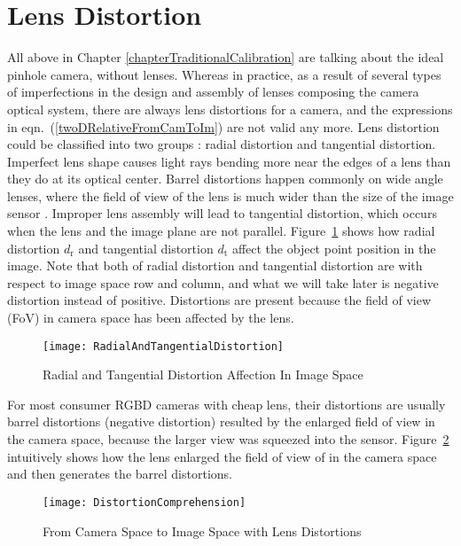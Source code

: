 \section{Lens Distortion}
\indent
All above in Chapter \ref{chapterTraditionalCalibration} are talking about the ideal pinhole camera, without lenses. Whereas in practice, as a result of several types of imperfections in the design and assembly of lenses composing the camera optical system, there are always lens distortions for a camera, and the expressions in eqn.~(\ref{twoDRelativeFromCamToIm}) are not valid any more. Lens distortion could be classified into two groups \cite{distortion1_1992} : radial distortion and tangential distortion. Imperfect lens shape causes light rays bending more near the edges of a lens than they do at its optical center. Barrel distortions happen commonly on wide angle lenses, where the field of view of the lens is much wider than the size of the image sensor \cite{whatisDistortion_2013}. Improper lens assembly will lead to tangential distortion, which occurs when the lens and the image plane are not parallel. Figure~\ref{RadialAndTangentialDistortion} shows how radial distortion \(d_\text{r}\) and tangential distortion \(d_\text{t}\) affect the object point position in the image. Note that both of radial distortion and tangential distortion are with respect to image space row and column, and what we will take later is negative distortion instead of positive. Distortions are present because the field of view (\gls{FoV}) in camera space has been affected by the lens. 
%
\begin{figure}[b]
\centering
\texttt{[image: RadialAndTangentialDistortion]}
\caption{Radial and Tangential Distortion Affection In Image Space}
\label{RadialAndTangentialDistortion}
\end{figure}%
%
For most consumer \gls{RGBD} cameras with cheap lens, their distortions are usually barrel distortions (negative distortion) resulted by the enlarged field  of view in the camera space, because the larger view was squeezed into the sensor. Figure~\ref{DistortionComprehension} intuitively shows how the lens enlarged the field of view of in the camera space and then generates the barrel distortions.
%
\begin{figure}[t]
\centering
\texttt{[image: DistortionComprehension]}
\caption{From Camera Space to Image Space with Lens Distortions}
\label{DistortionComprehension}
\end{figure}%

